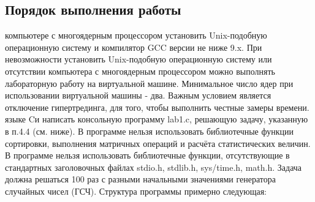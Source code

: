 { %
	\subsection{Порядок выполнения работы}
	\begin{enumerate}
		 компьютере с многоядерным процессором установить Unix-\linebreak подобную операционную систему и компилятор GCC версии не ниже 9.x. При невозможности установить Unix-подобную операционную систему или отсутствии компьютера с многоядерным процессором можно выполнять лабораторную работу на виртуальной машине. Минимальное число ядер при использовании виртуальной машины - два. Важным условием является отключение гипертрединга, для того, чтобы выполнить честные замеры времени. 
		 языке Cи написать консольную программу lab1.c, решающую задачу, указанную в п.4.4 (см. ниже). В программе нельзя использовать библиотечные функции сортировки, выполнения матричных операций и расчёта статистических величин. В программе нельзя использовать библиотечные функции, отсутствующие в стандартных заголовочных файлах stdio.h, stdlib.h, sys/time.h, math.h. Задача должна решаться 100 раз с разными начальными значениями генератора случайных чисел (ГСЧ). Структура программы примерно следующая:

        \inputminted[fontsize=\footnotesize]{c++}{listings/lab1Example.cpp}


\end{enumerate}}
